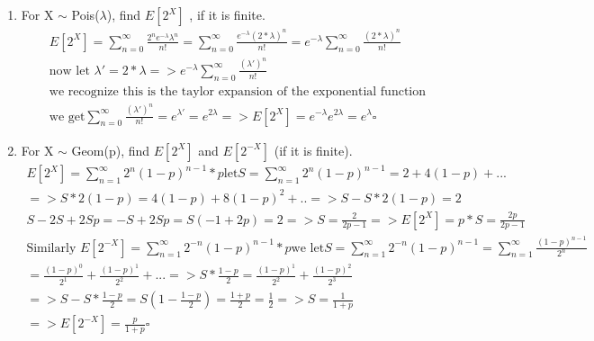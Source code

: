 \documentclass[11pt]{article}
\begin{document}
\begin{enumerate}
\item For X $\sim$ Pois($\lambda$), find $E[2^X]$ , if it is finite.
\begin{gather} 
	E[2^X] =\sum_{n=0}^{\infty} \frac{2^n e^{-\lambda} \lambda ^n}{n!} = \sum_{n=0}^{\infty} \frac{e^{-\lambda} (2*\lambda) ^n}{n!} = e^{-\lambda}  \sum_{n=0}^{\infty} \frac{(2*\lambda) ^n}{n!}\\
	\text{now let } \lambda' = 2*\lambda => e^{-\lambda}  \sum_{n=0}^{\infty} \frac{(\lambda') ^n}{n!}\\
	\text{we recognize this is the taylor expansion of the exponential function}\\
	\text{we get} \sum_{n=0}^{\infty} \frac{(\lambda') ^n}{n!} = e^{\lambda'} = e^{2\lambda}  => E[2^X] = e^{-\lambda} e^{2\lambda}  = e^{\lambda} \square
\end{gather}
\item For X $\sim$ Geom(p), find $E[2^X]$ and $E[2^{-X}]$ (if it is finite).
\begin{gather} 
E[2^X] =\sum_{n=1}^{\infty} 2^n (1-p)^{n-1}*p \text{let} S = \sum_{n=1}^{\infty} 2^n (1-p)^{n-1} = 2 + 4(1-p) +... \\
=>S*2(1-p) = 4(1-p) + 8(1-p)^2 + .. => S-S*2(1-p) = 2\\
S-2S+2Sp = -S+2Sp = S(-1 + 2p) = 2 => S = \frac{2}{2p-1} =>E[2^X]=p*S = \frac{2p}{2p-1} \\
\text{Similarly  }
E[2^{-X}] = \sum_{n=1}^{\infty} 2^{-n} (1-p)^{n-1}*p \text{we let} S =\sum_{n=1}^{\infty} 2^{-n} (1-p)^{n-1} = \sum_{n=1}^{\infty} \frac{(1-p)^{n-1}}{2^n}\\
= \frac{(1-p)^{0}}{2^1} + \frac{(1-p)^{1}}{2^2} + ... => S*\frac{1-p}{2} = \frac{(1-p)^{1}}{2^2} + \frac{(1-p)^{2}}{2^3} \\
=> S-S*\frac{1-p}{2} = S(1-\frac{1-p}{2}) = \frac{1+p}{2} = \frac{1}{2} => S = \frac{1}{1+p}\\
=> E[2^{-X}] = \frac{p}{1+p} \square
\end{gather}
\end{enumerate}
\end{document}
